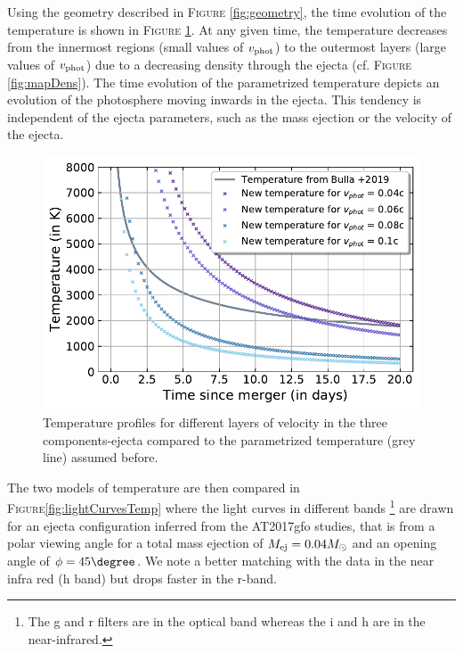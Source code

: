 \documentclass[a4paper, twoside, 11pt]{article}
\numberwithin{equation}{section}
\begin{document}
\hspace{\parindent}		Using the geometry described in  F\textsc{igure} \ref{fig:geometry},  the time evolution of the temperature is shown in  F\textsc{igure} \ref{fig:profilTemp}. At any given time, the temperature decreases from the innermost regions (small values of $v_{\rm{phot}}$) to the outermost layers (large values of $v_{\rm{phot}}$) due to a decreasing density through the ejecta (cf. F\textsc{igure} \ref{fig:mapDens}).  The time evolution of the parametrized temperature depicts an evolution of the photosphere moving inwards in the ejecta. This tendency is independent of the ejecta parameters, such as the mass ejection or the velocity of the ejecta.\\

\begin{figure}[!h]
\centering
\includegraphics[scale=0.7]{pictures/profile_temp_new_geo.pdf}
\caption[Temperature profiles]{Temperature profiles for different layers of velocity in the three components-ejecta compared to the parametrized temperature (grey line) assumed before\cite{POSSIS_2019}.}
\label{fig:profilTemp}
\end{figure}
	
\hspace{\parindent}	 The two models of temperature are then compared in  F\textsc{igure}\ref{fig:lightCurvesTemp} where the light curves in different bands \footnote{The g and r filters are in the optical band whereas the i and h are in the near-infrared.} are drawn for an ejecta configuration inferred from the AT2017gfo studies, that is from a polar viewing angle for a total mass ejection of $M_{\rm{ej}} = 0.04 M_{\odot}$ and an opening angle of $\phi = 45\degree$. We note a better matching with the data in the near infra red (h band) but drops faster in the r-band.  
\end{document}
